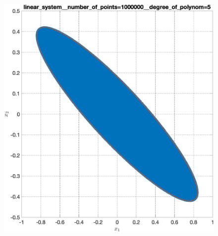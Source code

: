 \documentclass[../main.tex]{subfiles}
\begin{document}
\begin{figure}[ht!]
\begin{minipage}[b]{.49\linewidth}
  	\end{minipage}
  	\hfill
  	\begin{minipage}[b]{.49\linewidth} 
  		\small
  		\centering
  		\includegraphics[width=\linewidth]{images/linear_system__number_of_points=1000000__degree_of_polynom=5.eps}
  	\end{minipage} 
  \end{figure}
  
\end{document}
